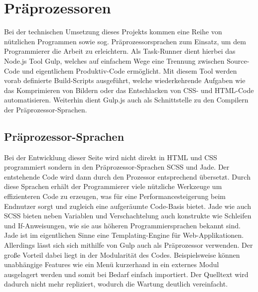 \section{Präprozessoren}\label{chapter:prepros}
Bei der technischen Umsetzung dieses Projekts kommen eine Reihe von nützlichen Programmen sowie sog. Präprozessorsprachen zum Einsatz, um dem Programmierer die Arbeit zu erleichtern.
Als Task-Runner dient hierbei das Node.js Tool Gulp, welches auf einfachem Wege eine Trennung zwischen Source-Code und eigentlichem Produktiv-Code ermöglicht. Mit diesem Tool werden vorab definierte Build-Scripts ausgeführt, welche wiederkehrende Aufgaben wie das Komprimieren von Bildern oder das Entschlacken von CSS- und HTML-Code automatisieren. Weiterhin dient Gulp.js auch als Schnittstelle zu den Compilern der Präprozessor-Sprachen.

\subsection{Präprozessor-Sprachen}
Bei der Entwicklung dieser Seite wird nicht direkt in HTML und CSS programmiert sondern in den Präprozessor-Sprachen SCSS und Jade. Der entstehende Code wird dann durch den Prozessor entsprechend übersetzt.
Durch diese Sprachen erhält der Programmierer viele nützliche Werkzeuge um effizienteren Code zu erzeugen, was für eine Performancesteigerung beim Endnutzer sorgt und zugleich eine aufgeräumte Code-Basis bietet.
Jade wie auch SCSS bieten neben Variablen und Verschachtelung auch konstrukte wie Schleifen und If-Anweisungen, wie sie aus höheren Programmiersprachen bekannt sind.
Jade ist im eigentlichen Sinne eine Templating-Engine für Web-Applikationen. Allerdings lässt sich sich mithilfe von Gulp auch als Präprozessor verwenden. Der große Vorteil dabei liegt in der Modularität des Codes. Beispielsweise können unabhängige Features wie ein Menü kurzerhand in ein externes Modul ausgelagert werden und somit bei Bedarf einfach importiert. Der Quelltext wird dadurch nicht mehr repliziert, wodurch die Wartung deutlich vereinfacht.

